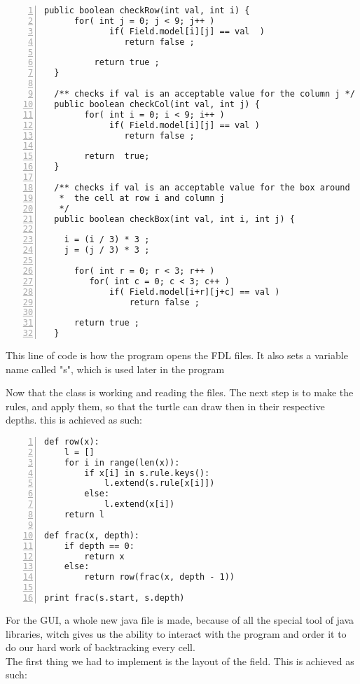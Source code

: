 \documentclass{article}
\begin{document}
\begin{lstlisting}[language=Tex, 
basicstyle=\footnotesize\ttfamily,
numbers=left,stepnumber=1,frame=lrtb, morekeywords={assert}, tabsize=4,
breaklines=false]
public boolean checkRow(int val, int i) {
	  for( int j = 0; j < 9; j++ )
	         if( Field.model[i][j] == val  )
	            return false ;

	      return true ;
  }

  /** checks if val is an acceptable value for the column j */
  public boolean checkCol(int val, int j) {
	    for( int i = 0; i < 9; i++ )
	         if( Field.model[i][j] == val )
	            return false ;
	    
	    return  true;
  }

  /** checks if val is an acceptable value for the box around
   *  the cell at row i and column j
   */
  public boolean checkBox(int val, int i, int j) {
      
	i = (i / 3) * 3 ;
    j = (j / 3) * 3 ;

      for( int r = 0; r < 3; r++ )
         for( int c = 0; c < 3; c++ )
        	 if( Field.model[i+r][j+c] == val )
        		 return false ;

      return true ;
  }
\end{lstlisting}
This line of code is how the program opens the FDL files. It also sets a variable name called "s", which is used later in the program 

\newpage

Now that the class is working and reading the files. The next step is to make the rules, and apply them, so that the turtle can draw then in their respective depths. this is achieved as such:\\

\begin{lstlisting}[language=Tex, basicstyle=\footnotesize\ttfamily,
numbers=left,stepnumber=1,frame=lrtb, morekeywords={assert}, tabsize=4,
breaklines=false]
def row(x):
	l = []
	for i in range(len(x)):
		if x[i] in s.rule.keys():
			l.extend(s.rule[x[i]])
		else:
			l.extend(x[i])
	return l

def frac(x, depth):
	if depth == 0:
		return x 
	else:
		return row(frac(x, depth - 1))

print frac(s.start, s.depth)
\end{lstlisting}

For the GUI, a whole new java file is made, because of all the special tool of java libraries, witch gives us the ability to interact with the program and order it to do our hard work of backtracking every cell. \\
The first thing we had to implement is the layout of the field.
This is achieved as such: 
\end{document}
